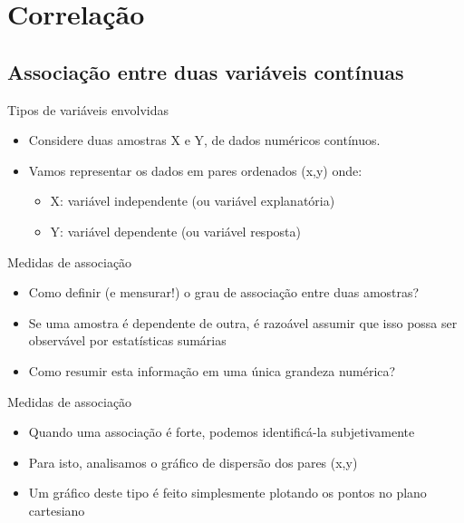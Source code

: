 \documentclass{beamer}
\begin{document}
\section{Correlação}

\subsection[Associação]{Associação entre duas variáveis contínuas}

\begin{frame}{Tipos de variáveis envolvidas}
  \begin{itemize}
  \item Considere duas amostras X e Y, de dados numéricos contínuos.
  \item Vamos representar os dados em pares ordenados (x,y) onde:
    \begin{itemize}
    \item X: variável independente (ou variável explanatória)
    \item Y: variável dependente (ou variável resposta)
    \end{itemize}
  \end{itemize}
\end{frame}

\begin{frame}{Medidas de associação}
  \begin{itemize}
  \item Como definir (e mensurar!) o grau de associação entre duas amostras?
  \item Se uma amostra é dependente de outra, é razoável assumir que isso
    possa ser observável por estatísticas sumárias
  \item Como resumir esta informação em uma única grandeza numérica?
  \end{itemize}
\end{frame}

\begin{frame}{Medidas de associação}
  \begin{itemize}
  \item Quando uma associação é forte, podemos identificá-la
    subjetivamente
  \item Para isto, analisamos o gráfico de dispersão dos pares (x,y)
  \item Um gráfico deste tipo é feito simplesmente plotando os pontos
    no plano cartesiano
  \end{itemize}
\end{frame}
\end{document}
